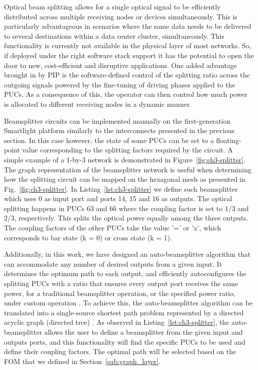 Optical beam splitting allows for a single optical signal to be efficiently distributed across multiple receiving nodes or devices simultaneously.
This is particularly advantageous in scenarios where the same data needs to be delivered to several destinations within a data center cluster, simultaneously.
This functionality is currently not available in the physical layer of most networks.
So, if deployed under the right software stack support it has the potential to open the door to new, cost-efficient and disruptive applications.
One added advantage brought in by PIP is the software-defined control of the splitting ratio across the outgoing signals powered by the fine-tuning of driving phases applied to the PUCs.
As a consequence of this, the operator can then control how much power is allocated to different receiving nodes in a dynamic manner.

Beamsplitter circuits can be implemented manually on the first-generation Smartlight platform similarly to the interconnects presented in the previous section.
In this case however, the state of some PUCs can be set to a floating-point value corresponding to the splitting factors required by the circuit.
A simple example of a 1-by-3 network is demonstrated in Figure~\ref{fig:ch3-splitter}.
The graph representation of the beamsplitter network is useful when determining how the splitting circuit can be mapped on the hexagonal mesh as presented in Fig.~\ref{fig:ch3-splitter}.
In Listing~\ref{lst:ch3-splitter} we define such beamsplitter which uses 0 as input port and ports 14, 15 and 16 as outputs.
The optical splitting happens in PUCs 63 and 66 where the coupling factor is set to 1/3 and 2/3, respectively.
This splits the optical power equally among the three outputs.
The coupling factors of the other PUCs take the value '=' or 'x', which corresponds to bar state (k = 0) or cross state (k = 1).

Additionally, in this work, we have designed an auto-beamsplitter algorithm that can accommodate any number of desired outputs from a given input.
It determines the optimum path to each output, and efficiently autoconfigures the splitting PUCs with a ratio that ensures every output port receives the same power, for a traditional beamsplitter operation, or the specified power ratio, under custom operation \cite{xie_software-defined_2024}.
To achieve this, the auto-beamsplitter algorithm can be translated into a single-source shortest path problem represented by a directed acyclic graph (directed tree) \cite{perez-lopez_programmable_2018}.
As observed in Listing~\ref{lst:ch3-splitter}, the auto-beamsplitter allows the user to define a beamsplitter from the given input and outputs ports, and this functionality will find the specific PUCs to be used and define their coupling factors.
The optimal path will be selected based on the FOM that we defined in Section~\ref{sub:graph_layer}.

